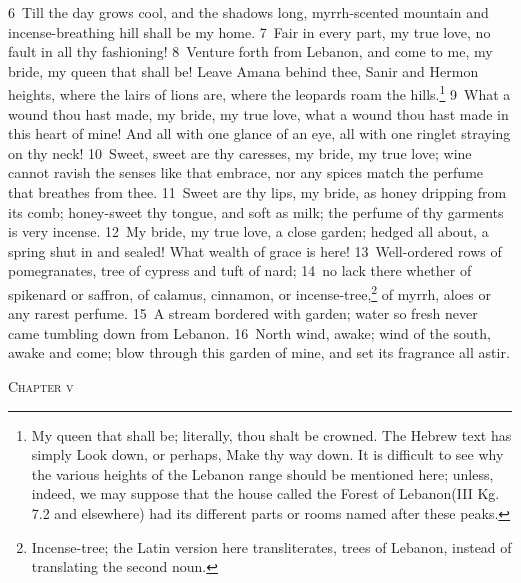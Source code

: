 \documentclass[10pt]{book} %
\begin{document}
\textcolor{benred8}{6}~Till the day grows cool, and the shadows long, myrrh-scented mountain and incense-breathing hill shall be my home.
\textcolor{benred8}{7}~Fair in every part, my true love, no fault in all thy fashioning! \textcolor{benred8}{8}~Venture forth from Lebanon, and come to me, my bride, my queen that shall be! Leave Amana behind thee, Sanir and Hermon heights, where the lairs of lions are, where the leopards roam the hills.\footnote[2]{\textasciigrave My queen that shall be\textquotesingle ; literally, \textasciigrave thou shalt be crowned\textquotesingle . The Hebrew text has simply \textasciigrave Look down\textquotesingle , or perhaps, \textasciigrave Make thy way down\textquotesingle . It is difficult to see why the various heights of the Lebanon range should be mentioned here; unless, indeed, we may suppose that the house called \textasciigrave the Forest of Lebanon\textquotesingle  (III Kg. 7.2 and elsewhere) had its different parts or rooms named after these peaks.}
\textcolor{benred8}{9}~What a wound thou hast made, my bride, my true love, what a wound thou hast made in this heart of mine! And all with one glance of an eye, all with one ringlet straying on thy neck! \textcolor{benred8}{10}~Sweet, sweet are thy caresses, my bride, my true love; wine cannot ravish the senses like that embrace, nor any spices match the perfume that breathes from thee. \textcolor{benred8}{11}~Sweet are thy lips, my bride, as honey dripping from its comb; honey-sweet thy tongue, and soft as milk; the perfume of thy garments is very incense. \textcolor{benred8}{12}~My bride, my true love, a close garden; hedged all about, a spring shut in and sealed! What wealth of grace is here! \textcolor{benred8}{13}~Well-ordered rows of pomegranates, tree of cypress and tuft of nard; \textcolor{benred8}{14}~no lack there whether of spikenard or saffron, of calamus, cinnamon, or incense-tree,\footnote[3]{\textasciigrave Incense-tree\textquotesingle ; the Latin version here transliterates, \textasciigrave trees of Lebanon\textquotesingle , instead of translating the second noun.} of myrrh, aloes or any rarest perfume. \textcolor{benred8}{15}~A stream bordered with garden; water so fresh never came tumbling down from Lebanon.
\textcolor{benred8}{16}~North wind, awake; wind of the south, awake and come; blow through this garden of mine, and set its fragrance all astir.
\begin{large}\begin{center}\textsc{Chapter v}\end{center}\end{large}
\end{document}

